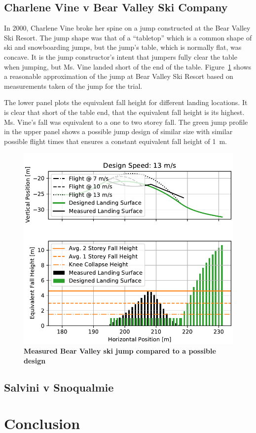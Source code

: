 \documentclass{article}
\begin{document}
\subsection{Charlene Vine v Bear Valley Ski Company}
%
In 2000, Charlene Vine broke her spine on a jump constructed at the Bear Valley
Ski Resort. The jump shape was that of a ``tabletop'' which is a common shape
of ski and snowboarding jumps, but the jump's table, which is normally flat,
was concave. It is the jump constructor's intent that jumpers fully clear the
table when jumping, but Ms. Vine landed short of the end of the table.
Figure~\ref{fig:vine-v-bear-valley} shows a reasonable approximation of the
jump at Bear Valley Ski Resort based on measurements taken of the jump for the
trial.

The lower panel plots the equivalent fall height for different landing
locations. It is clear that short of the table end, that the equivalent fall
height is its highest. Ms. Vine's fall was equivalent to a one to two storey
fall. The green jump profile in the upper panel shows a possible jump design of
similar size with similar possible flight times that ensures a constant
equivalent fall height of 1~\si{\meter}.
%
\begin{figure}
  \centering
  \includegraphics[width=5.25in]{figures/vine-v-bear-valley.pdf}
  \caption{\textbf{Measured Bear Valley ski jump compared to a possible design}\\

    }
  \label{fig:vine-v-bear-valley}
\end{figure}

\subsection{Salvini v Snoqualmie}

\section{Conclusion}
\end{document}
